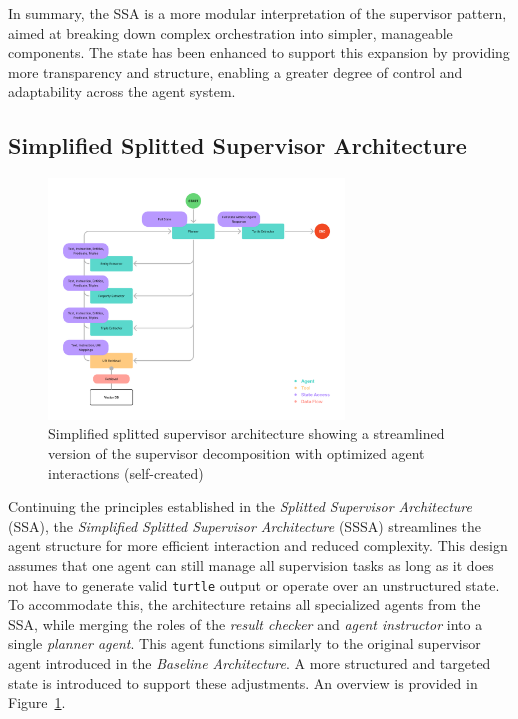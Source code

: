 \documentclass[a4paper,oneside,bibliography=totoc]{scrbook}
\begin{document}
In summary, the \ac{SSA} is a more modular interpretation of the supervisor pattern, aimed at breaking down complex orchestration into simpler, manageable components. The state has been enhanced to support this expansion by providing more transparency and structure, enabling a greater degree of control and adaptability across the agent system.

\subsection{Simplified Splitted Supervisor Architecture}
\label{subsec:simplified_splitted_supervisor}

\begin{figure}[tp]
  \centering
  \includegraphics[width=0.7\textwidth]{figures/Simplified Splitted Supervisor Architecture.png}
  \caption[Simplified splitted supervisor architecture showing a streamlined version of the supervisor decomposition with optimized agent interactions]{Simplified splitted supervisor architecture showing a streamlined version of the supervisor decomposition with optimized agent interactions (self-created)}
  \label{fig:simplified_splitted_supervisor_architecture}
\end{figure}

Continuing the principles established in the \textit{Splitted Supervisor Architecture} (\ac{SSA}), the \textit{Simplified Splitted Supervisor Architecture} (\ac{SSSA}) streamlines the agent structure for more efficient interaction and reduced complexity. This design assumes that one agent can still manage all supervision tasks as long as it does not have to generate valid \texttt{turtle} output or operate over an unstructured state. To accommodate this, the architecture retains all specialized agents from the \ac{SSA}, while merging the roles of the \textit{result checker} and \textit{agent instructor} into a single \textit{planner agent}. This agent functions similarly to the original supervisor agent introduced in the \textit{Baseline Architecture}. A more structured and targeted state is introduced to support these adjustments. An overview is provided in Figure~\ref{fig:simplified_splitted_supervisor_architecture}.
\end{document}

